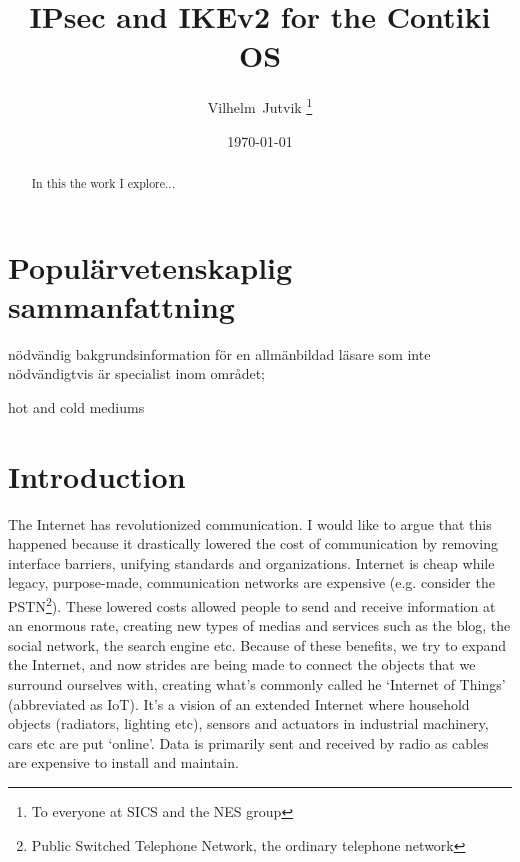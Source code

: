 \documentclass[final,a4paper,twoside,11pt,onecolumn]{report}
\begin{document}
\author{Vilhelm~Jutvik \thanks{To everyone at SICS and the NES group}}
\date{\today}
\title{IPsec and IKEv2 for the Contiki OS}

\maketitle

% 
% 

\begin{abstract}
In this the work I explore...
\end{abstract}

\setcounter{tocdepth}{4}
\tableofcontents

\chapter{Populärvetenskaplig sammanfattning}
nödvändig bakgrundsinformation för en allmänbildad läsare som inte nödvändigtvis är specialist inom området;

hot and cold mediums

\chapter{Introduction}
\label{cha:intro}
The Internet has revolutionized communication. I would like to argue that this happened because it drastically lowered the cost of communication by removing interface barriers, unifying standards and organizations. Internet is cheap while legacy, purpose-made, communication networks are expensive (e.g. consider the PSTN\footnote{Public Switched Telephone Network, the ordinary telephone network}). These lowered costs allowed people to send and receive information at an enormous rate, creating new types of medias and services such as the blog, the social network, the search engine etc. Because of these benefits, we try to expand the Internet, and now strides are being made to connect the objects that we surround ourselves with, creating what's commonly called he `Internet of Things' (abbreviated as IoT). It's a vision of an extended Internet where household objects (radiators, lighting etc), sensors and actuators in industrial machinery, cars etc are put `online'. Data is primarily sent and received by radio as cables are expensive to install and maintain.
\end{document}

